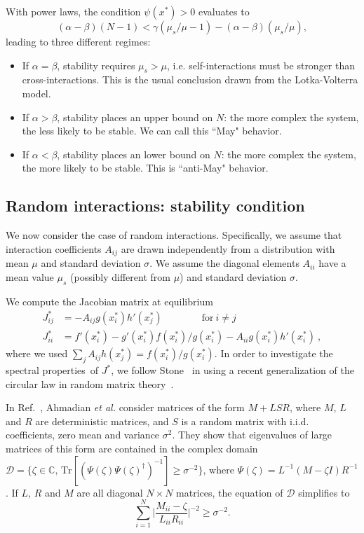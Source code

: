 \documentclass[
 pre,
 twocolumn,
 amsmath,
 amssymb,
 aps,
]{revtex4-2}
\begin{document}
With power laws, the condition $\psi(x^*)>0$ evaluates to 
\begin{equation}
    (\alpha - \beta)(N-1) < \gamma(\mu_s/\mu- 1) - (\alpha - \beta)(\mu_s/\mu),
\end{equation}
leading to three different regimes:
\begin{itemize}
    \item If $\alpha = \beta$, stability requires $\mu_s > \mu$, i.e.
    self-interactions must be stronger than cross-interactions.
    This is the usual conclusion drawn from the Lotka-Volterra model.
    \item If $\alpha > \beta$, stability places an upper bound on $N$: the more complex the system, the less likely to be stable.
    We can call this ``May" behavior.
    \item If $\alpha < \beta$, stability places an lower bound on $N$: the more complex the system, the more likely to be stable.
    This is ``anti-May" behavior.
\end{itemize}

\subsection{Random interactions: stability condition}
We now consider the case of random interactions.
Specifically, we assume that interaction coefficients $A_{ij}$ are drawn independently from a distribution with mean $\mu$ and standard deviation $\sigma$.
We assume the diagonal elements $A_{ii}$ have a mean value $\mu_s$ (possibly different from $\mu$) and standard deviation $\sigma$. 
 
We compute the Jacobian matrix at equilibrium
\begin{align}
    J_{ij}^* & = - A_{ij}g(x_i^*)h'(x_j^*) \qquad \qquad \textrm{for} \ i\neq j \label{eq: jac off-diag}\\
    J_{ii}^* & = f'(x_i^*) - g'(x_i^*)f(x_i^*)/g(x_i^*) - A_{ii}g(x_i^*)h'(x_i^*) \ , \label{eq: jac diag}
\end{align}
where we used $\sum_{j}A_{ij}h(x_j^*)=f(x_i^*)/g(x_i^*)$.
In order to investigate the spectral properties of $J^*$, 
we follow Stone~\cite{Stone2018} in using a recent generalization of the circular law in random matrix theory~\cite{Ahmadian2015}.

In Ref.~\cite{Ahmadian2015}, Ahmadian \emph{et al.} consider matrices of the form $M + LSR$, where $M$,  
$L$ and $R$ are deterministic matrices, and $S$ is a random matrix with i.i.d. coefficients, zero mean and variance $\sigma^2$.
They show that eigenvalues of large matrices of this form are contained in the complex domain $\mathcal{D} = \{\zeta \in \mathbb{C},\, \textrm{Tr}[(\Psi(\zeta) \Psi(\zeta)^\dagger)^{-1}]\geq \sigma^{-2}\}$, where $\Psi(\zeta) = L^{-1}(M-\zeta I)R^{-1}$. If $L$, $R$ and $M$ are all diagonal $N\times N$ matrices, the equation of $\mathcal{D}$ simplifies to 
\begin{equation}
    \sum_{i=1}^N\Big\vert\frac{M_{ii} - \zeta}{L_{ii}R_{ii}}\Big\vert^{-2}\geq \sigma^{-2}.
\label{eq: domain}
\end{equation}
\end{document}
